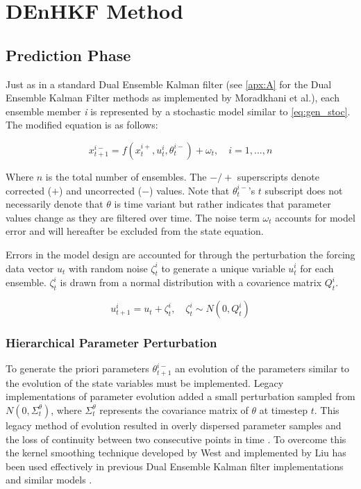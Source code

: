 \section{DEnHKF Method}

\subsection{Prediction Phase}

Just as in a standard Dual Ensemble Kalman filter (see \autoref{apx:A} for the Dual Ensemble Kalman Filter methods as implemented by Moradkhani et al.), each ensemble member \textit{i} is represented by a stochastic model similar to \eqref{eq:gen_stoc}. The modified equation is as follows:

\begin{equation}\label{eq:hdekf_predict}
x_{t+1}^{i-} = f(x_{t}^{i+}, u_{t}^{i}, \theta^{i-}_{t}) + \omega_{t}, \quad i=1,...,n
\end{equation}

Where $n$ is the total number of ensembles. The $-/+$ superscripts denote corrected ($+$) and uncorrected ($-$) values. Note that $\theta^{i-}_{t}$'s $t$ subscript does not necessarily denote that $\theta$ is time variant but rather indicates that parameter values change as they are filtered over time. The noise term $\omega_{t}$ accounts for model error and will hereafter be excluded from the state equation.

Errors in the model design are accounted for through the perturbation the forcing data vector $u_{t}$ with random noise $\zeta_{t}^{i}$ to generate a unique variable $u_{t}^{i}$ for each ensemble. $\zeta_{t}^{i}$ is drawn from a normal distribution with a covarience matrix $Q_{t}^{i}$.

\begin{equation}\label{eq:hdekf_u}
u_{t+1}^{i} = u_{t} + \zeta_{t}^{i}, \quad \zeta_{t}^{i} \sim N(0,Q_{t}^{i}) 
\end{equation}

\subsubsection{Hierarchical Parameter Perturbation}

To generate the priori parameters $\theta^{i-}_{t+1}$ an evolution of the parameters similar to the evolution of the state variables must be implemented. Legacy implementations of parameter evolution added a small perturbation sampled from $N(0,\Sigma^{\theta}_{t})$, where $\Sigma^{\theta}_{t}$ represents the covariance matrix of $\theta$ at timestep $t$. This legacy method of evolution resulted in overly dispersed parameter samples and the loss of continuity between two consecutive points in time \cite{Liu2000} \cite{Chen2008}. To overcome this the kernel smoothing technique developed by West \cite{West1993} and implemented by Liu \cite{Liu2000} has been used effectively in previous Dual Ensemble Kalman filter implementations \cite{Moradkhani2005} and similar models \cite{Chen2008}.

